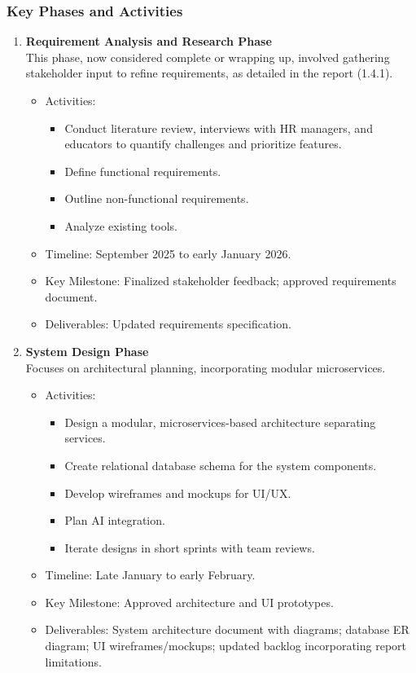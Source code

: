 \subsubsection{Key Phases and Activities}
\begin{enumerate}[leftmargin=*,label=\textbf{\arabic*.}]
    \item \textbf{Requirement Analysis and Research Phase}\\
    This phase, now considered complete or wrapping up, involved gathering stakeholder input to refine requirements, as detailed in the report (1.4.1).
    \begin{itemize}[leftmargin=1.6em]
        \item Activities:
        \begin{itemize}[leftmargin=1.4em]
            \item Conduct literature review, interviews with HR managers, and educators to quantify challenges and prioritize features.
            \item Define functional requirements.
            \item Outline non-functional requirements.
            \item Analyze existing tools.
        \end{itemize}
        \item Timeline: September 2025 to early January 2026.
        \item Key Milestone: Finalized stakeholder feedback; approved requirements document.
        \item Deliverables: Updated requirements specification.
    \end{itemize}

    \item \textbf{System Design Phase}\\
    Focuses on architectural planning, incorporating modular microservices.
    \begin{itemize}[leftmargin=1.6em]
        \item Activities:
        \begin{itemize}[leftmargin=1.4em]
            \item Design a modular, microservices-based architecture separating services.
            \item Create relational database schema for the system components.
            \item Develop wireframes and mockups for UI/UX.
            \item Plan AI integration.
            \item Iterate designs in short sprints with team reviews.
        \end{itemize}
        \item Timeline: Late January to early February.
        \item Key Milestone: Approved architecture and UI prototypes.
        \item Deliverables: System architecture document with diagrams; database ER diagram; UI wireframes/mockups; updated backlog incorporating report limitations.
    \end{itemize}


\end{enumerate}

